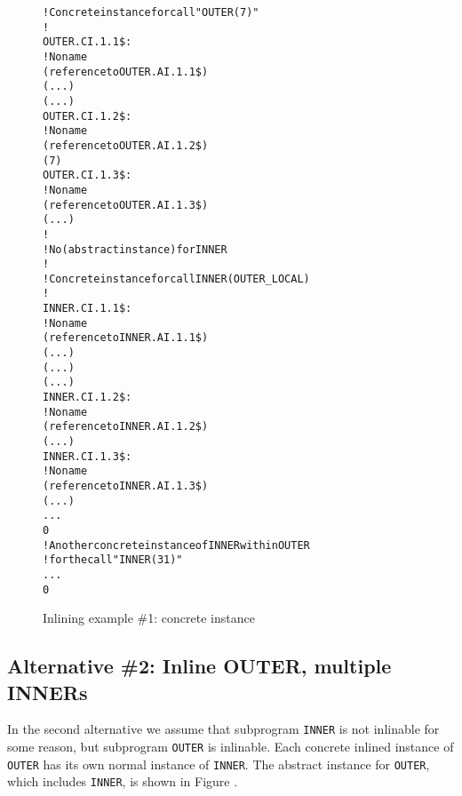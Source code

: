 \begin{figure}[p]
\begin{dwflisting}
\begin{alltt}
! Concrete instance for call "OUTER(7)"
! 
OUTER.CI.1.1\$:
    \DWTAGinlinedsubroutine
        ! No name
        \DWATabstractorigin(reference to OUTER.AI.1.1\$)
        \DWATlowpc(...)
        \DWAThighpc(...)
OUTER.CI.1.2\$:
        \DWTAGformalparameter
            ! No name
            \DWATabstractorigin(reference to OUTER.AI.1.2\$)
            \DWATconstvalue(7)
OUTER.CI.1.3\$:
        \DWTAGvariable
            ! No name
            \DWATabstractorigin(reference to OUTER.AI.1.3\$)
            \DWATlocation(...)
        !
        ! No \DWTAGsubprogram (abstract instance) for INNER
        !
        ! Concrete instance for call INNER(OUTER\_LOCAL)
        !
INNER.CI.1.1\$:
        \DWTAGinlinedsubroutine
            ! No name
            \DWATabstractorigin(reference to INNER.AI.1.1\$)
            \DWATlowpc(...)
            \DWAThighpc(...)
            \DWATstaticlink(...)
INNER.CI.1.2\$:
            \DWTAGformalparameter
                ! No name
                \DWATabstractorigin(reference to INNER.AI.1.2\$)
                \DWATlocation(...)
INNER.CI.1.3\$:
            \DWTAGvariable
                ! No name
                \DWATabstractorigin(reference to INNER.AI.1.3\$)
                \DWATlocation(...)
            ...
            0
        ! Another concrete instance of INNER within OUTER
        ! for the call "INNER(31)"
        ...
        0
\end{alltt}
\end{dwflisting}
\caption{Inlining example \#1: concrete instance}
\label{fig:inliningexample1concreteinstance}
\end{figure}

\subsection{Alternative \#2: Inline OUTER, multiple INNERs}
\label{app:inlineoutermultiipleinners}


In the second alternative we assume that subprogram \texttt{INNER}
is not inlinable for some reason, but subprogram \texttt{OUTER} is
inlinable. 
Each concrete inlined instance of \texttt{OUTER} has its
own normal instance of \texttt{INNER}. 
The abstract instance for \texttt{OUTER},
which includes \texttt{INNER}, is shown in 
Figure .

